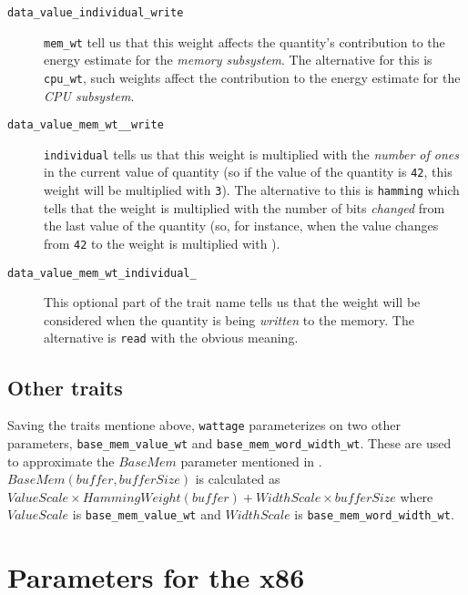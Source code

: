 \begin{description}
\item[\texttt{data\_value\_individual\_write}] \hfill

  \texttt{mem\_wt} tell us that this weight affects the quantity's
  contribution to the energy estimate for the \textit{memory
    subsystem}.  The alternative for this is \texttt{cpu\_wt}, such
  weights affect the contribution to the energy estimate for the
  \textit{CPU subsystem}.

\item[\texttt{data\_value\_mem\_wt\_\_write}] \hfill

  \texttt{individual} tells us that this weight is multiplied with the
  \textit{number of ones} in the current value of quantity (so if the
  value of the quantity is \texttt{42}, this weight will be multiplied
  with \texttt{3}).  The alternative to this is \texttt{hamming} which
  tells that the weight is multiplied with the number of bits
  \textit{changed} from the last value of the quantity (so, for
  instance, when the value changes from \texttt{42} to  the
  weight is multiplied with ).

\item[\texttt{data\_value\_mem\_wt\_individual\_}] \hfill

  This optional part of the trait name tells us that the weight will
  be considered when the quantity is being \textit{written} to the
  memory.  The alternative is \texttt{read} with the obvious meaning.
  
\end{description}

\subsection{Other traits}

Saving the traits mentione above, \texttt{wattage} parameterizes on
two other parameters, \texttt{base\_mem\_value\_wt} and
\texttt{base\_mem\_word\_width\_wt}.  These are used to approximate
the $BaseMem$ parameter mentioned in \cite{steinke}.  $BaseMem(buffer,
bufferSize)$ is calculated as $ValueScale \times HammingWeight(buffer)
+ WidthScale \times bufferSize$ where $ValueScale$ is
\texttt{base\_mem\_value\_wt} and $WidthScale$ is
\texttt{base\_mem\_word\_width\_wt}.

\section{Parameters for the x86}

